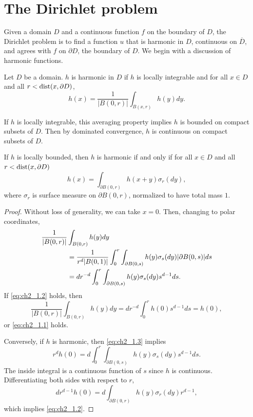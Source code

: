 \label{ch2}

\section{The Dirichlet problem}\label{ch2_sec1}


Given a domain $D$ and a continuous function $f$ on the boundary of $D$, the Dirichlet problem is to find a function $u$ that is harmonic in $D$, continuous on $\overline{D}$, and agrees with $f$ on $\partial D$, the boundary of $D$. We begin with a discussion of harmonic functions.

\begin{definition}\label{def:ch2_1.1}
Let $D$ be a domain. $h$ is harmonic in $D$ if $h$ is locally integrable and for all $x \in D$ and all $r < \operatorname{dist}(x,\partial D)$,
\begin{equation}\label{eq:ch2_1.1}
    h(x) = \frac{1}{|B(0,r)|} \int_{B(x,r)} h(y)dy.
\end{equation}
\end{definition}

If $h$ is locally integrable, this averaging property implies $h$ is bounded on compact subsets of $D$. Then by dominated convergence, $h$ is continuous on compact subsets of $D$.

\begin{proposition}\label{prop:ch2_1.2}
If $h$ is locally bounded, then $h$ is harmonic if and only if for all $x \in D$ and all $r < \operatorname{dist}(x,\partial D)$
\begin{equation}\label{eq:ch2_1.2}
    h(x) = \int_{\partial B(0,r)} h(x + y)\sigma_r(dy),
\end{equation}
where $\sigma_r$ is surface measure on $\partial B(0,r)$, normalized to have total mass $1$.
\end{proposition}

\begin{proof}
Without loss of generality, we can take $x = 0$. Then, changing to polar coordinates,
\begin{align}\label{eq:ch2_1.3}
    \frac{1}{|B(0,r)|} &\int_{B(0,r)} h(y)dy \\
    &= \frac{1}{r^d|B(0,1)|} \int_0^r \int_{\partial B(0,s)} h(y)\sigma_s(dy)|\partial B(0,s)| ds \notag \\
    &= dr^{-d} \int_0^r \int_{\partial B(0,s)} h(y)\sigma_s(dy)s^{d-1}ds. \notag
\end{align}
If \eqref{eq:ch2_1.2} holds, then
\[
    \frac{1}{|B(0,r)|} \int_{B(0,r)} h(y)dy = dr^{-d} \int_0^r h(0)s^{d-1}ds = h(0),
\]
or \eqref{eq:ch2_1.1} holds.

Conversely, if $h$ is harmonic, then \eqref{eq:ch2_1.3} implies
\[
    r^dh(0) = d \int_0^r \int_{\partial B(0,s)} h(y)\sigma_s(dy)s^{d-1}ds.
\]
The inside integral is a continuous function of $s$ since $h$ is continuous. Differentiating both sides with respect to $r$,
\[
    dr^{d-1}h(0) = d \int_{\partial B(0,r)} h(y)\sigma_r(dy)r^{d-1},
\]
which implies \eqref{eq:ch2_1.2}.
\end{proof}

